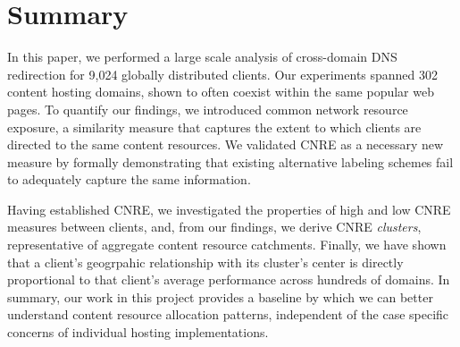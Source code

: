 \section{Summary}

In this paper, we performed a large scale analysis of cross-domain DNS
redirection for 9,024 globally distributed clients. Our experiments spanned 
302 content hosting domains, shown to often coexist within the same popular web pages.
To quantify our findings, we introduced common network resource exposure, a
similarity measure that captures the extent to which clients are directed to the
same content resources. We validated CNRE as a necessary new measure by formally demonstrating that existing alternative labeling schemes fail to adequately
capture the same information.

Having established CNRE, we investigated the properties of high and low CNRE
measures between clients, and, from our findings, we derive CNRE \emph{clusters},
representative of aggregate content resource catchments. Finally, we have shown that a
client's geogrpahic relationship with its cluster's center is directly
proportional to that client's average performance across hundreds of domains. In
summary, our work in this project provides a baseline by which we can better
understand content resource allocation patterns, independent of the case specific
concerns of individual hosting implementations.
